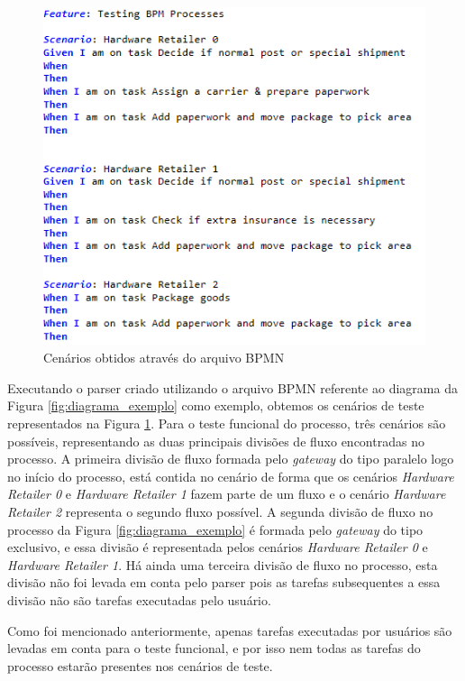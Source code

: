 \documentclass[12pt]{article}
\begin{document}
\begin{figure}[ht]
\includegraphics[width=.8\paperwidth]{figuras/cenario_resultado.png}
\caption{Cenários obtidos através do arquivo BPMN}
\label{fig:cenario_resultado}
\end{figure}

Executando o parser criado utilizando o arquivo BPMN referente ao diagrama da Figura \ref{fig:diagrama_exemplo} como exemplo, obtemos os cenários de teste representados na Figura \ref{fig:cenario_resultado}. Para o teste funcional do processo, três cenários são possíveis, representando as duas principais divisões de fluxo encontradas no processo. A primeira divisão de fluxo formada pelo \emph{gateway} do tipo paralelo logo no início do processo, está contida no cenário de forma que os cenários \emph{Hardware Retailer 0} e \emph{Hardware Retailer 1} fazem parte de um fluxo e o cenário \emph{Hardware Retailer 2} representa o segundo fluxo possível. A segunda divisão de fluxo no processo da Figura \ref{fig:diagrama_exemplo} é formada pelo \emph{gateway} do tipo exclusivo, e essa divisão é representada pelos cenários \emph{Hardware Retailer 0} e \emph{Hardware Retailer 1}. Há ainda uma terceira divisão de fluxo no processo, esta divisão não foi levada em conta pelo parser pois as tarefas subsequentes a essa divisão não são tarefas executadas pelo usuário.

Como foi mencionado anteriormente, apenas tarefas executadas por usuários são levadas em conta para o teste funcional, e por isso nem todas as tarefas do processo estarão presentes nos cenários de teste.
\end{document}
